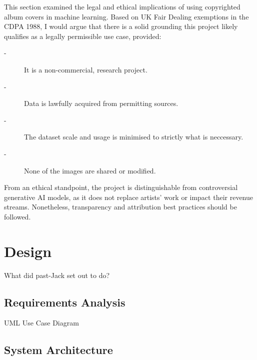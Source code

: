                  This section examined the legal and ethical implications of using copyrighted album covers in machine learning. Based on UK Fair Dealing exemptions in the CDPA 1988, I would argue that there is a solid grounding this project likely qualifies as a legally permissible use case, provided:
                  \begin{description}
                      \item[-] It is a non-commercial, research project.
                      \item[-] Data is lawfully acquired from permitting sources.
                      \item[-] The dataset scale and usage is minimised to strictly what is neccessary.
                      \item[-] None of the images are shared or modified. %
                  \end{description}
                  
                  From an ethical standpoint, the project is distinguishable from controversial generative AI models, as it does not replace artists’ work or impact their revenue streams. Nonetheless, transparency and attribution best practices should be followed.
    
    \section{Design} %
        \begin{temp}
            What did past-Jack set out to do?
        \end{temp}
        
        \subsection{Requirements Analysis}
    
            \begin{temp}
                UML Use Case Diagram
            \end{temp}
        
        \subsection{System Architecture} %
    
